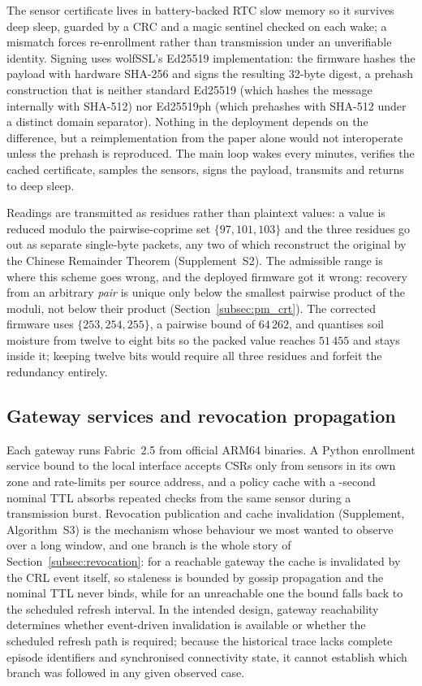 \documentclass[a4paper,fleqn]{cas-sc}
\begin{document}
The sensor certificate lives in battery-backed RTC slow memory so it
survives deep sleep, guarded by a CRC and a magic sentinel checked on each
wake; a mismatch forces re-enrollment rather than transmission under an
unverifiable identity. Signing uses wolfSSL's Ed25519 implementation: the
firmware hashes the payload with hardware SHA-256 and signs the resulting
32-byte digest, a prehash construction that is neither standard Ed25519
(which hashes the message internally with SHA-512) nor Ed25519ph (which
prehashes with SHA-512 under a distinct domain separator). Nothing in the
deployment depends on the difference, but a reimplementation from the
paper alone would not interoperate unless the prehash is reproduced. The
main loop wakes every \DutyCycleMinutes{} minutes, verifies the cached
certificate, samples the sensors, signs the payload, transmits and returns
to deep sleep.

Readings are transmitted as residues rather than plaintext values: a value
is reduced modulo the pairwise-coprime set $\{97, 101, 103\}$ and the three
residues go out as separate single-byte packets, any two of which
reconstruct the original by the Chinese Remainder Theorem
\cite{garner1959residue} (Supplement~S2). The admissible range is where
this scheme goes wrong, and the deployed firmware got it wrong: recovery
from an arbitrary \emph{pair} is unique only below the smallest pairwise
product of the moduli, not below their product (Section~\ref{subsec:pm_crt}).
The corrected firmware uses $\{253, 254, 255\}$, a pairwise bound of
$64\,262$, and quantises soil moisture from twelve to eight bits so the
packed value reaches $51\,455$ and stays inside it; keeping twelve bits
would require all three residues and forfeit the redundancy entirely.

\subsection{Gateway services and revocation propagation}
\label{subsec:gateway}

Each gateway runs Fabric~2.5 from official ARM64 binaries. A Python
enrollment service bound to the local interface accepts CSRs only from
sensors in its own zone and rate-limits per source address, and a policy
cache with a \RevCacheTTL-second nominal TTL absorbs repeated checks from
the same sensor during a transmission burst. Revocation publication and
cache invalidation (Supplement, Algorithm~S3) is the mechanism whose
behaviour we most wanted to observe over a long window, and one branch is
the whole story of Section~\ref{subsec:revocation}: for a reachable
gateway the cache is invalidated by the CRL event itself, so staleness is
bounded by gossip propagation and the nominal TTL never binds, while for an
unreachable one the bound falls back to the scheduled refresh interval.
In the intended design, gateway reachability determines whether
event-driven invalidation is available or whether the scheduled refresh
path is required; because the historical trace lacks complete episode
identifiers and synchronised connectivity state, it cannot establish
which branch was followed in any given observed case.
\end{document}
